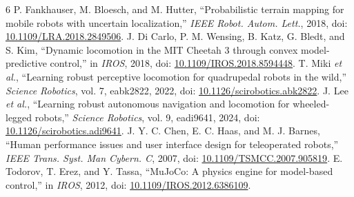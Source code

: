\documentclass[conference]{IEEEtran}
\begin{document}
\begin{thebibliography}{6}
 P. Fankhauser, M. Bloesch, and M. Hutter, ``Probabilistic terrain mapping for mobile robots with uncertain localization,'' \emph{IEEE Robot. Autom. Lett.}, 2018, doi: \url{10.1109/LRA.2018.2849506}.
 J. Di Carlo, P. M. Wensing, B. Katz, G. Bledt, and S. Kim, ``Dynamic locomotion in the MIT Cheetah 3 through convex model-predictive control,'' in \emph{IROS}, 2018, doi: \url{10.1109/IROS.2018.8594448}.
 T. Miki \emph{et al.}, ``Learning robust perceptive locomotion for quadrupedal robots in the wild,'' \emph{Science Robotics}, vol. 7, eabk2822, 2022, doi: \url{10.1126/scirobotics.abk2822}.
 J. Lee \emph{et al.}, ``Learning robust autonomous navigation and locomotion for wheeled-legged robots,'' \emph{Science Robotics}, vol. 9, eadi9641, 2024, doi: \url{10.1126/scirobotics.adi9641}.
 J. Y. C. Chen, E. C. Haas, and M. J. Barnes, ``Human performance issues and user interface design for teleoperated robots,'' \emph{IEEE Trans. Syst. Man Cybern. C}, 2007, doi: \url{10.1109/TSMCC.2007.905819}.
 E. Todorov, T. Erez, and Y. Tassa, ``MuJoCo: A physics engine for model-based control,'' in \emph{IROS}, 2012, doi: \url{10.1109/IROS.2012.6386109}.
\end{thebibliography}
\end{document}
